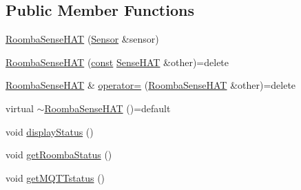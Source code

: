 \subsection*{Public Member Functions}
\begin{DoxyCompactItemize}
\item 
\hyperlink{class_roomba_sense_h_a_t_a72dcec927c5b2274a39789e0274cc0fd}{Roomba\+Sense\+H\+AT} (\hyperlink{class_sensor}{Sensor} \&sensor)
\item 
\hyperlink{class_roomba_sense_h_a_t_a51bc74e91051739c83f3b79e574f8b58}{Roomba\+Sense\+H\+AT} (\hyperlink{functions__c_8js_afacfd9c985d225bb07483b887a801b6f}{const} \hyperlink{class_sense_h_a_t}{Sense\+H\+AT} \&other)=delete
\item 
\hyperlink{class_roomba_sense_h_a_t}{Roomba\+Sense\+H\+AT} \& \hyperlink{class_roomba_sense_h_a_t_a55718c0f738b82c383083ece3b026930}{operator=} (\hyperlink{class_roomba_sense_h_a_t}{Roomba\+Sense\+H\+AT} \&other)=delete
\item 
virtual \hyperlink{class_roomba_sense_h_a_t_a1c63fdac14092128d6918f7bfaa8c711}{$\sim$\+Roomba\+Sense\+H\+AT} ()=default
\item 
void \hyperlink{class_roomba_sense_h_a_t_ad818e7105b0e47a88f93963edea85474}{display\+Status} ()
\item 
void \hyperlink{class_roomba_sense_h_a_t_abadc74cb7f41e91ed7884bd3568ddb86}{get\+Roomba\+Status} ()
\item 
void \hyperlink{class_roomba_sense_h_a_t_a2b5e58a1b75b3e7008e3f21aa890f54a}{get\+M\+Q\+T\+Tstatus} ()
\end{DoxyCompactItemize}
